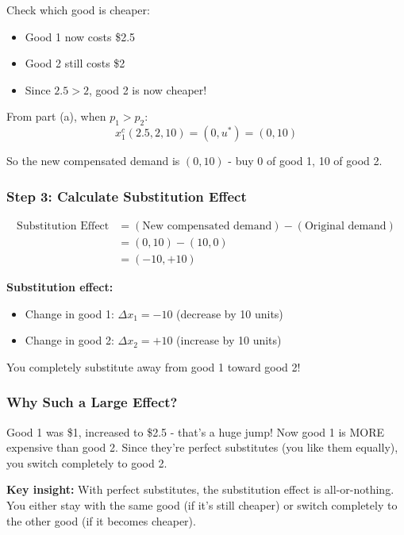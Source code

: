 \documentclass[11pt]{article}
\begin{document}
Check which good is cheaper:
\begin{itemize}
\item Good 1 now costs \$2.5
\item Good 2 still costs \$2
\item Since $2.5 > 2$, good 2 is now cheaper!
\end{itemize}

From part (a), when $p_1 > p_2$:
$$x_1^c(2.5, 2, 10) = (0, u^*) = (0, 10)$$

So the new compensated demand is $(0, 10)$ - buy 0 of good 1, 10 of good 2.

\subsubsection{Step 3: Calculate Substitution Effect}

\begin{align*}
\text{Substitution Effect} &= (\text{New compensated demand}) - (\text{Original demand}) \\
&= (0, 10) - (10, 0) \\
&= (-10, +10)
\end{align*}

\begin{tcolorbox}[colback=yellow!10!white,colframe=orange!75!black,title=Answer to Part (c)(ii)]
\textbf{Substitution effect:}
\begin{itemize}
\item Change in good 1: $\Delta x_1 = -10$ (decrease by 10 units)
\item Change in good 2: $\Delta x_2 = +10$ (increase by 10 units)
\end{itemize}

You completely substitute away from good 1 toward good 2!
\end{tcolorbox}

\subsubsection{Why Such a Large Effect?}

Good 1 was \$1, increased to \$2.5 - that's a huge jump! Now good 1 is MORE expensive than good 2. Since they're perfect substitutes (you like them equally), you switch completely to good 2.

\textbf{Key insight:} With perfect substitutes, the substitution effect is all-or-nothing. You either stay with the same good (if it's still cheaper) or switch completely to the other good (if it becomes cheaper).
\end{document}
